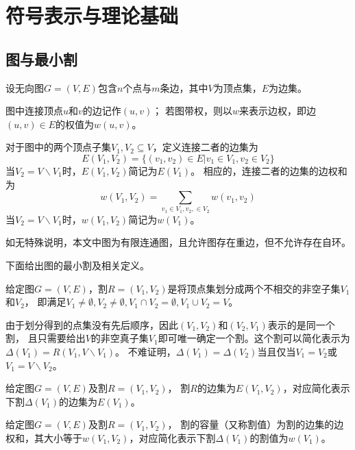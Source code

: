 \chapter{符号表示与理论基础}

\section{图与最小割}

设无向图$G=(V,E)$包含$n$个点与$m$条边，其中$V$为顶点集，$E$为边集。

图中连接顶点$u$和$v$的边记作$(u,v)$；
若图带权，则以$w$来表示边权，即边$(u,v)\in E$的权值为$w(u,v)$。

对于图中的两个顶点子集$V_1,V_2\subseteq V$，定义连接二者的边集为
\begin{equation*}
    E(V_1,V_2)=\{(v_1,v_2)\in E|v_1\in V_1,v_2\in V_2\}
\end{equation*}
当$V_2=V\backslash V_1$时，$E(V_1,V_2)$简记为$E(V_1)$。
相应的，连接二者的边集的边权和为
\begin{equation*}
    w(V_1,V_2)=\sum_{v_1\in V_1,v_2,\in V_2}w(v_1,v_2)
\end{equation*}
当$V_2=V\backslash V_1$时，$w(V_1,V_2)$简记为$w(V_1)$。

如无特殊说明，本文中图为有限连通图，且允许图存在重边，但不允许存在自环。

下面给出图的最小割及相关定义。
\begin{definition}
   给定图$G=(V,E)$，割$R=(V_1,V_2)$是将顶点集划分成两个不相交的非空子集$V_1$和$V_2$，
   即满足$V_1\neq \emptyset,V_2\neq \emptyset,V_1\cap V_2=\emptyset,V_1\cup V_2=V$。
\end{definition}
由于划分得到的点集没有先后顺序，因此$(V_1,V_2)$和$(V_2,V_1)$表示的是同一个割，
且只需要给出$V$的非空真子集$V_1$即可唯一确定一个割。这个割可以简化表示为$\Delta(V_1)=R(V_1,V\backslash V_1)$。
不难证明，$\Delta(V_1)=\Delta(V_2)$当且仅当$V_1=V_2$或$V_1=V\backslash V_2$。

\begin{definition}
    给定图$G=(V,E)$及割$R=(V_1,V_2)$，
    割$R$的边集为$E(V_1,V_2)$，对应简化表示下割$\Delta(V_1)$的边集为$E(V_1)$。
\end{definition}

\begin{definition}
    给定图$G=(V,E)$及割$R=(V_1,V_2)$，
    割的容量（又称割值）为割的边集的边权和，其大小等于$ w(V_1,V_2)$，对应简化表示下割$\Delta(V_1)$的割值为$w(V_1)$。
\end{definition}

